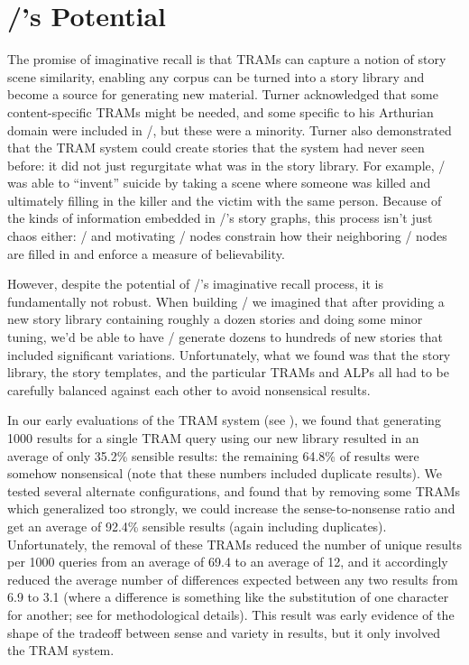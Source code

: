 \section{\minstrel/'s Potential}

The promise of imaginative recall is that TRAMs can capture a notion of story scene similarity, enabling any corpus can be turned into a story library and become a source for generating new material.
%
Turner acknowledged that some content-specific TRAMs might be needed, and some specific to his Arthurian domain were included in \minstrel/, but these were a minority.
%
Turner also demonstrated that the TRAM system could create stories that the system had never seen before: it did not just regurgitate what was in the story library.
%
For example, \minstrel/ was able to ``invent'' suicide by taking a scene where someone was killed and ultimately filling in the killer and the victim with the same person.
%
Because of the kinds of information embedded in \minstrel/'s story graphs, this process isn't just chaos either: \gng/ and motivating \gns/ nodes constrain how their neighboring \gna/ nodes are filled in and enforce a measure of believability.


However, despite the potential of \minstrel/'s imaginative recall process, it is fundamentally not robust.
%
When building \skald/ we imagined that after providing a new story library containing roughly a dozen stories and doing some minor tuning, we'd be able to have \skald/ generate dozens to hundreds of new stories that included significant variations.
%
Unfortunately, what we found was that the story library, the story templates, and the particular TRAMs and ALPs all had to be carefully balanced against each other to avoid nonsensical results.


In our early evaluations of the TRAM system (see \citep{Tearse2011}), we found that generating 1000 results for a single TRAM query using our new library resulted in an average of only 35.2\% sensible results: the remaining 64.8\% of results were somehow nonsensical (note that these numbers included duplicate results).
%
We tested several alternate configurations, and found that by removing some TRAMs which generalized too strongly, we could increase the sense-to-nonsense ratio and get an average of 92.4\% sensible results (again including duplicates).
%
Unfortunately, the removal of these TRAMs reduced the number of unique results per 1000 queries from an average of 69.4 to an average of 12, and it accordingly reduced the average number of differences expected between any two results from  6.9 to 3.1 (where a difference is something like the substitution of one character for another; see \citep{Tearse2011} for methodological details).
%
This result was early evidence of the shape of the tradeoff between sense and variety in results, but it only involved the TRAM system.


